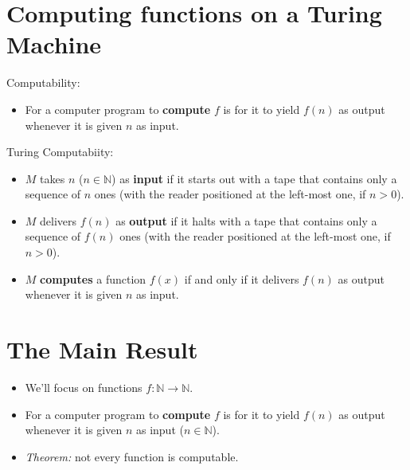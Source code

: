 \documentclass[12pt]{extarticle}
\begin{document}
\section{Computing functions on a Turing Machine}

Computability:
\begin{itemize}

\item For a computer program to \textbf{compute} $f$ is for it to yield $f(n)$ as output whenever it is given $n$ as input. 

\end{itemize}

\noindent
Turing Computabiity:
\begin{itemize}

\item $M$ takes \(n\) ($n \in \mathbb{N}$) as \textbf{input} if it starts out with a tape that contains only a sequence of \(n\) ones (with the reader positioned at the left-most one, if $n > 0$).

\item  $M$ delivers \(f(n)\) as \textbf{output} if it halts with a tape that contains only a sequence of \(f(n)\) ones (with the reader positioned at the left-most one, if $n > 0$).

\item $M$ \textbf{computes} a function \(f(x)\) if and only if it delivers \(f(n)\) as output whenever it is given $n$ as input.

\end{itemize}






\section{The Main Result}

\begin{itemize}

\item We'll focus on functions $f: \mathbb{N} \rightarrow \mathbb{N}$.

\item For a computer program to \textbf{compute} $f$ is for it to yield $f(n)$ as output whenever it is given $n$ as input ($n \in \mathbb{N}$). 

\item \emph{Theorem:} not every function is computable.



\end{itemize}
\end{document}
